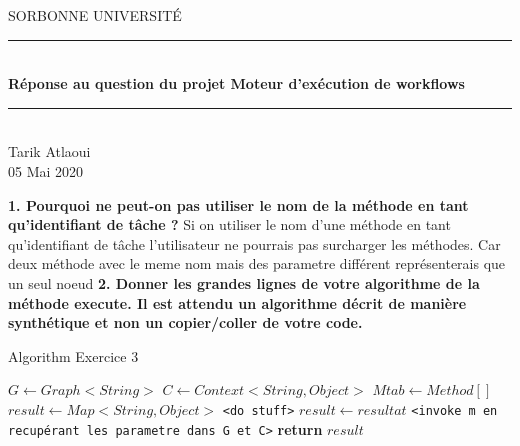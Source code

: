 \documentclass{article}
\date{\today}
\author{Tarik Atlaoui}
\begin{document}
\makeatletter
\def\BState{\State\hskip-\ALG@thistlm}
\makeatother

\begin{titlepage}
	\enlargethispage{2cm}
	\newcommand{\HRule}{\rule{\linewidth}{0.5mm}}
	\center
	\textsc{\LARGE
	SORBONNE UNIVERSITÉ 
	} \\[1cm]
	\HRule \\[0.4cm]
	{ \huge \bfseries Réponse au question du projet Moteur d’exécution de workflows \\[0.15cm] }
	\HRule \\[4cm]
	\large{Tarik Atlaoui} \\[3cm]
	05 Mai 2020 \\[3cm]

\end{titlepage}

\textbf{1. Pourquoi ne peut-on pas utiliser le nom de la méthode en tant qu’identifiant de tâche ?}
\newline
\newline
   Si on utiliser le nom d'une méthode en tant qu'identifiant de tâche l'utilisateur ne pourrais pas surcharger les méthodes.
   Car deux méthode avec le meme nom mais des parametre différent représenterais que un seul noeud
\newline
\newline
\textbf{2. Donner les grandes lignes de votre algorithme de la méthode execute. Il est attendu un
algorithme décrit de manière synthétique et non un copier/coller de votre code.}

\begin{algorithm}
  \caption{Algorithm Exercice 3}\label{euclid}
  \begin{algorithmic}[1]
      \State $G\gets Graph<String>$
      \State $C\gets Context<String , Object>$
      \State $Mtab\gets Method[]$
      \State $result\gets Map<String , Object>$
        \State \texttt{<do stuff>}      
          \State $result\gets resultat$
        \EndIf
        \EndFor
        \State \texttt{<invoke m en recupérant les parametre dans G et C>}
      \EndFor
      \State \textbf{return} $result$
    \EndProcedure
  \end{algorithmic}
\end{algorithm}
\end{document}
